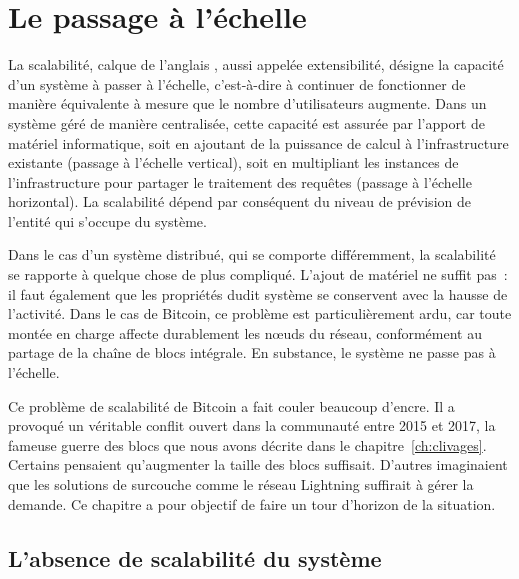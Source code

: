
\chapter{Le passage à l'échelle}
\label{ch:scalabilite}

La scalabilité, calque de l'anglais , aussi appelée extensibilité, désigne la capacité d'un système à passer à l'échelle, c'est-à-dire à continuer de fonctionner de manière équivalente à mesure que le nombre d'utilisateurs augmente. Dans un système géré de manière centralisée, cette capacité est assurée par l'apport de matériel informatique, soit en ajoutant de la puissance de calcul à l'infrastructure existante (passage à l'échelle vertical), soit en multipliant les instances de l'infrastructure pour partager le traitement des requêtes (passage à l'échelle horizontal). La scalabilité dépend par conséquent du niveau de prévision de l'entité qui s'occupe du système.

Dans le cas d'un système distribué, qui se comporte différemment, la scalabilité se rapporte à quelque chose de plus compliqué. L'ajout de matériel ne suffit pas~: il faut également que les propriétés dudit système se conservent avec la hausse de l'activité. Dans le cas de Bitcoin, ce problème est particulièrement ardu, car toute montée en charge affecte durablement les nœuds du réseau, conformément au partage de la chaîne de blocs intégrale. En substance, le système ne passe pas à l'échelle.

Ce problème de scalabilité de Bitcoin a fait couler beaucoup d'encre. Il a provoqué un véritable conflit ouvert dans la communauté entre 2015 et 2017, la fameuse guerre des blocs que nous avons décrite dans le chapitre~\ref{ch:clivages}. Certains pensaient qu'augmenter la taille des blocs suffisait. D'autres imaginaient que les solutions de surcouche comme le réseau Lightning suffirait à gérer la demande. Ce chapitre a pour objectif de faire un tour d'horizon de la situation.

\section*{L'absence de scalabilité du système} %

